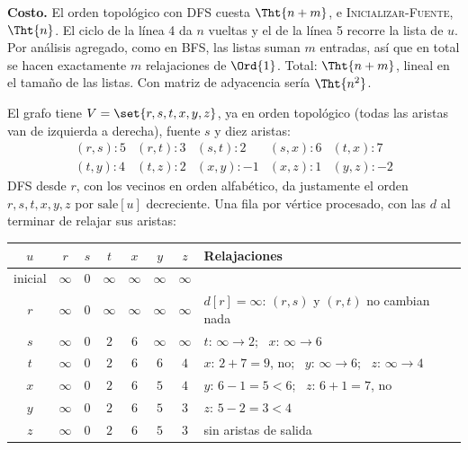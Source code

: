 \documentclass[11pt,letterpaper]{article}
\begin{document}
\textbf{Costo.} El orden topológico con DFS cuesta $\Tht{n + m}$, e
\textsc{Inicializar-Fuente}, $\Tht{n}$. El ciclo de la línea 4 da $n$
vueltas y el de la línea 5 recorre la lista de $u$. Por análisis
agregado, como en BFS, las listas suman $m$ entradas, así que en total
se hacen exactamente $m$ relajaciones de $\Ord{1}$. Total:
$\Tht{n + m}$, lineal en el tamaño de las listas. Con matriz de
adyacencia sería $\Tht{n^2}$.

\begin{ejemplo}
  \label{ej:caminos-dag-24-5}
  El grafo tiene $V = \set{r, s, t, x, y, z}$, ya en orden
  topológico (todas las aristas van de izquierda a derecha), fuente
  $s$ y diez aristas:
  \[
    \begin{array}{lllll}
      (r, s) : 5 & (r, t) : 3 & (s, t) : 2 & (s, x) : 6
        & (t, x) : 7 \\
      (t, y) : 4 & (t, z) : 2 & (x, y) : -1 & (x, z) : 1
        & (y, z) : -2
    \end{array}
  \]
  DFS desde $r$, con los vecinos en orden alfabético, da justamente el
  orden $r, s, t, x, y, z$ por $\text{sale}[u]$ decreciente. Una fila
  por vértice procesado, con las $d$ al terminar de relajar sus
  aristas:
  \begin{center}
  \small
  \begin{tabular}{cccccccl}
    \toprule
    $u$ & $r$ & $s$ & $t$ & $x$ & $y$ & $z$
      & \textbf{Relajaciones} \\
    \midrule
    inicial & $\infty$ & $0$ & $\infty$ & $\infty$ & $\infty$
      & $\infty$ & \\
    $r$ & $\infty$ & $0$ & $\infty$ & $\infty$ & $\infty$ & $\infty$
      & $d[r] = \infty$: $(r, s)$ y $(r, t)$ no cambian nada \\
    $s$ & $\infty$ & $0$ & $2$ & $6$ & $\infty$ & $\infty$
      & $t$: $\infty \to 2$; \ $x$: $\infty \to 6$ \\
    $t$ & $\infty$ & $0$ & $2$ & $6$ & $6$ & $4$
      & $x$: $2 + 7 = 9$, no; \ $y$: $\infty \to 6$;
        \ $z$: $\infty \to 4$ \\
    $x$ & $\infty$ & $0$ & $2$ & $6$ & $5$ & $4$
      & $y$: $6 - 1 = 5 < 6$; \ $z$: $6 + 1 = 7$, no \\
    $y$ & $\infty$ & $0$ & $2$ & $6$ & $5$ & $3$
      & $z$: $5 - 2 = 3 < 4$ \\
    $z$ & $\infty$ & $0$ & $2$ & $6$ & $5$ & $3$
      & sin aristas de salida \\
    \bottomrule

\end{tabular}
\end{center}
\end{ejemplo}
\end{document}
